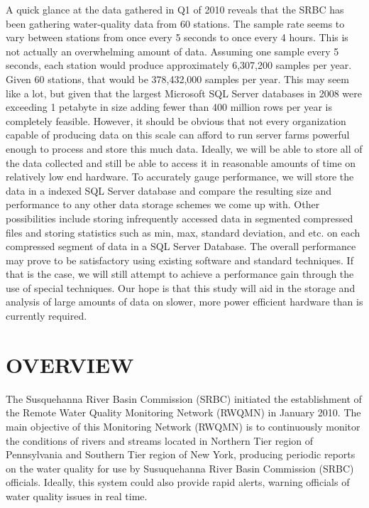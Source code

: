 \documentclass[a4paper]{article}
\begin{document}
\begin{minipage}[t]{0.45\textwidth}
{\normalsize  
A quick glance at the data gathered in Q1 of 2010 reveals that the SRBC has been gathering water-quality data from 60 stations. 
The sample rate seems to vary between stations from once every 5 seconds to once every 4 hours. 
This is not actually an overwhelming amount of data. 
Assuming one sample every 5 seconds, each station would produce approximately 6,307,200 samples per year. 
Given 60 stations, that would be 378,432,000 samples per year. 
This may seem like a lot, but given that the largest Microsoft SQL Server databases in 2008 were exceeding 1 petabyte in size adding fewer than 400 million rows per year is completely feasible. 
However, it should be obvious that not every organization capable of producing data on this scale can afford to run server farms powerful enough to process and store this much data. 
Ideally, we will be able to store all of the data collected and still be able to access it in reasonable amounts of time on relatively low end hardware. 
To accurately gauge performance, we will store the data in a indexed SQL Server database and compare the resulting size and performance to any other data storage schemes we come up with. 
Other possibilities include storing infrequently accessed data in segmented compressed files and storing statistics such as min, max, standard deviation, and etc. on each compressed segment of data in a SQL Server Database. 
The overall performance may prove to be satisfactory using existing software and standard techniques. 
If that is the case, we will still attempt to achieve a performance gain through the use of special techniques. 
Our hope is that this study will aid in the storage and analysis of large amounts of data on slower, more power efficient hardware than is currently required.}
\section*{OVERVIEW}{\normalsize 
The Susquehanna River Basin Commission (SRBC) initiated the establishment of the Remote Water Quality Monitoring Network (RWQMN) in January 2010.
The main objective of this Monitoring Network (RWQMN) is to continuously monitor the conditions of rivers and streams located in Northern Tier region of Pennsylvania and Southern Tier region of New York, producing periodic reports on the water quality for use by Susuquehanna River Basin Commission (SRBC) officials. 
Ideally, this system could also provide rapid alerts, warning officials of water quality issues in real time.}
\end{minipage}  
\end{document}
